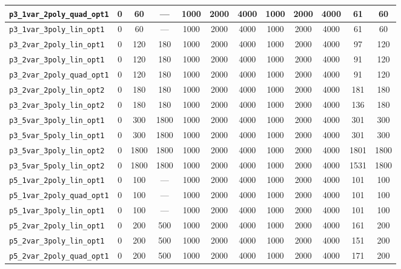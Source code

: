 \begin{landscape}
\begin{table}[H]
{\begin{tabular}{lccccccccccc}
\hline
\texttt{p3\_1var\_2poly\_quad\_opt1} & 0 & 60 & --- & 1000 & 2000 & 4000 & 1000 & 2000 & 4000 & 61 & 60 \\
\hline
\texttt{p3\_1var\_3poly\_lin\_opt1} & 0 & 60 & --- & 1000 & 2000 & 4000 & 1000 & 2000 & 4000 & 61 & 60 \\
\hline
\texttt{p3\_2var\_2poly\_lin\_opt1} & 0 & 120 & 180 & 1000 & 2000 & 4000 & 1000 & 2000 & 4000 & 97 & 120 \\
\hline
\texttt{p3\_2var\_3poly\_lin\_opt1} & 0 & 120 & 180 & 1000 & 2000 & 4000 & 1000 & 2000 & 4000 & 91 & 120 \\
\hline
\texttt{p3\_2var\_2poly\_quad\_opt1} & 0 & 120 & 180 & 1000 & 2000 & 4000 & 1000 & 2000 & 4000 & 91 & 120 \\
\hline
\texttt{p3\_2var\_2poly\_lin\_opt2} & 0 & 180 & 180 & 1000 & 2000 & 4000 & 1000 & 2000 & 4000 & 181 & 180 \\
\hline
\texttt{p3\_2var\_3poly\_lin\_opt2} & 0 & 180 & 180 & 1000 & 2000 & 4000 & 1000 & 2000 & 4000 & 136 & 180 \\
\hline
\texttt{p3\_5var\_3poly\_lin\_opt1} & 0 & 300 & 1800 & 1000 & 2000 & 4000 & 1000 & 2000 & 4000 & 301 & 300 \\
\hline
\texttt{p3\_5var\_5poly\_lin\_opt1} & 0 & 300 & 1800 & 1000 & 2000 & 4000 & 1000 & 2000 & 4000 & 301 & 300 \\
\hline
\texttt{p3\_5var\_3poly\_lin\_opt2} & 0 & 1800 & 1800 & 1000 & 2000 & 4000 & 1000 & 2000 & 4000 & 1801 & 1800 \\
\hline
\texttt{p3\_5var\_5poly\_lin\_opt2} & 0 & 1800 & 1800 & 1000 & 2000 & 4000 & 1000 & 2000 & 4000 & 1531 & 1800 \\
\hline
\texttt{p5\_1var\_2poly\_lin\_opt1} & 0 & 100 & --- & 1000 & 2000 & 4000 & 1000 & 2000 & 4000 & 101 & 100 \\
\hline
\texttt{p5\_1var\_2poly\_quad\_opt1} & 0 & 100 & --- & 1000 & 2000 & 4000 & 1000 & 2000 & 4000 & 101 & 100 \\
\hline
\texttt{p5\_1var\_3poly\_lin\_opt1} & 0 & 100 & --- & 1000 & 2000 & 4000 & 1000 & 2000 & 4000 & 101 & 100 \\
\hline
\texttt{p5\_2var\_2poly\_lin\_opt1} & 0 & 200 & 500 & 1000 & 2000 & 4000 & 1000 & 2000 & 4000 & 161 & 200 \\
\hline
\texttt{p5\_2var\_3poly\_lin\_opt1} & 0 & 200 & 500 & 1000 & 2000 & 4000 & 1000 & 2000 & 4000 & 151 & 200 \\
\hline
\texttt{p5\_2var\_2poly\_quad\_opt1} & 0 & 200 & 500 & 1000 & 2000 & 4000 & 1000 & 2000 & 4000 & 171 & 200 \\

\end{tabular}}
\end{table}
\end{landscape}
